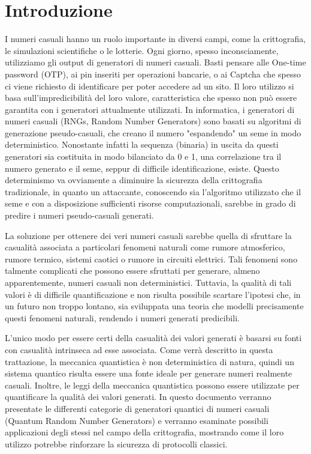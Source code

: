 \chapter{Introduzione}

I numeri casuali hanno un ruolo importante in diversi campi, come la crittografia, le simulazioni scientifiche o le lotterie. Ogni giorno, spesso inconsciamente, utilizziamo gli output di generatori di numeri casuali. Basti pensare alle One-time password (OTP), ai pin inseriti per operazioni bancarie, o ai Captcha che spesso ci viene richiesto di identificare per poter accedere ad un sito.
Il loro utilizzo si basa sull'impredicibilità del loro valore, caratteristica che spesso non può essere garantita con i generatori attualmente utilizzati. In informatica, i generatori di numeri casuali (RNGs, Random Number Generators) sono basati su algoritmi di generazione pseudo-casuali, che creano il numero "espandendo" un seme in modo deterministico. Nonostante infatti la sequenza (binaria) in uscita da questi generatori sia costituita in modo bilanciato da 0 e 1, una correlazione tra il numero generato e il seme, seppur di difficile identificazione, esiste. Questo determinismo va ovviamente a diminuire la sicurezza della crittografia tradizionale, in quanto un attaccante, conoscendo sia l'algoritmo utilizzato che il seme e con a disposizione sufficienti risorse computazionali, sarebbe in grado di predire i numeri pseudo-casuali generati. 

La soluzione per ottenere dei veri numeri casuali sarebbe quella di sfruttare la casualità associata a particolari fenomeni naturali come rumore atmosferico, rumore termico, sistemi caotici o rumore in circuiti elettrici. Tali fenomeni sono talmente complicati che possono essere sfruttati per generare, almeno apparentemente, numeri casuali non deterministici. Tuttavia, la qualità di tali valori è di difficile quantificazione e non risulta possibile scartare l'ipotesi che, in un futuro non troppo lontano, sia sviluppata una teoria che modelli precisamente questi fenomeni naturali, rendendo i numeri generati predicibili.

L'unico modo per essere certi della casualità dei valori generati è basarsi su fonti con casualità intrinseca ad esse associata. Come verrà descritto in questa trattazione, la meccanica quantistica è non deterministica di natura, quindi un sistema quantico risulta essere una fonte ideale per generare numeri realmente casuali. Inoltre, le leggi della meccanica quantistica possono essere utilizzate per quantificare la qualità dei valori generati. In questo documento verranno presentate le differenti categorie di generatori quantici di numeri casuali (Quantum Random Number Generators) e verranno esaminate possibili applicazioni degli stessi nel campo della crittografia, mostrando come il loro utilizzo potrebbe rinforzare la sicurezza di protocolli classici.